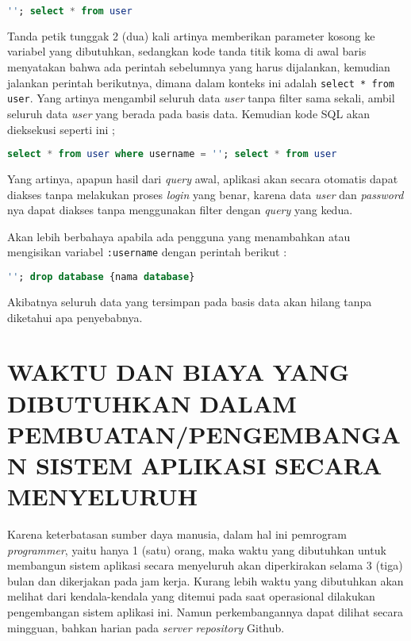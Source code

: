 \documentclass[pdftex,12pt, oneside]{article}
\begin{document}
\begin{itemize}
  \begin{lstlisting}[language=sql]
    ''; select * from user
  \end{lstlisting}
  
  Tanda petik tunggak 2 (dua) kali artinya memberikan parameter kosong ke variabel yang dibutuhkan, sedangkan kode tanda titik koma di awal baris menyatakan bahwa ada perintah sebelumnya yang harus dijalankan, kemudian jalankan perintah berikutnya, dimana dalam konteks ini adalah \texttt{select * from user}. Yang artinya mengambil seluruh data \textit{user} tanpa filter sama sekali, ambil seluruh data \textit{user} yang berada pada basis data. Kemudian kode SQL akan dieksekusi seperti ini ;
  
  \begin{lstlisting}[language=sql]
    select * from user where username = ''; select * from user
  \end{lstlisting}
  
  Yang artinya, apapun hasil dari \textit{query} awal, aplikasi akan secara otomatis dapat diakses tanpa melakukan proses \textit{login} yang benar, karena data \textit{user} dan \textit{password} nya dapat diakses tanpa menggunakan filter dengan \textit{query} yang kedua.
  
  Akan lebih berbahaya apabila ada pengguna yang menambahkan atau mengisikan variabel \texttt{:username} dengan perintah berikut :
  
  \begin{lstlisting}[language=sql]
    ''; drop database {nama database}
  \end{lstlisting}
  
  Akibatnya seluruh data yang tersimpan pada basis data akan hilang tanpa diketahui apa penyebabnya.
  
\end{itemize}


\section{WAKTU DAN BIAYA YANG DIBUTUHKAN DALAM PEMBUATAN/PENGEMBANGAN SISTEM APLIKASI SECARA MENYELURUH}

Karena keterbatasan sumber daya manusia, dalam hal ini pemrogram \textit{programmer}, yaitu hanya 1 (satu) orang, maka waktu yang dibutuhkan untuk membangun sistem aplikasi secara menyeluruh akan diperkirakan selama 3 (tiga) bulan dan dikerjakan pada jam kerja. Kurang lebih waktu yang dibutuhkan akan melihat dari kendala-kendala yang ditemui pada saat operasional dilakukan pengembangan sistem aplikasi ini. Namun perkembangannya dapat dilihat secara mingguan, bahkan harian pada \textit{server repository} Github.
\end{document}
